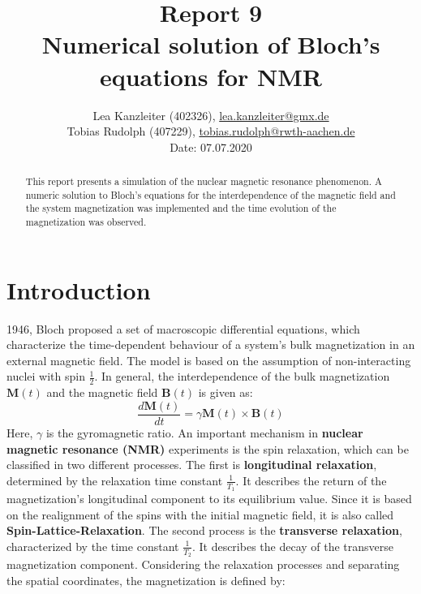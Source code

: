 \documentclass[journal]{IEEEtran} %
\begin{document}
\title{Report 9 \\
Numerical solution of Bloch's equations for NMR}

%
\author{Lea Kanzleiter (402326), \href{mailto:lea.kanzleiter@gmx.de}{lea.kanzleiter@gmx.de}  \\
Tobias Rudolph (407229), \href{mailto:tobias.rudolph@rwth-aachen.de}{tobias.rudolph@rwth-aachen.de} \\
Date: 07.07.2020
}

\maketitle
\begin{abstract}
This report presents a simulation of the nuclear magnetic resonance phenomenon. A numeric solution to Bloch's equations for the interdependence of the magnetic field and the system magnetization was implemented and the time evolution of the magnetization was observed.
\end{abstract}



\section{Introduction}\label{intro}
 1946, Bloch proposed a set of macroscopic differential equations, which characterize the time-dependent behaviour of a system's bulk magnetization in an external magnetic field. The model is based on the assumption of non-interacting nuclei with spin $\frac{1}{2}$. In general, the interdependence of the bulk magnetization $\mathbf{M}(t)$ and the magnetic field $\mathbf{B}(t)$ is given as:
\begin{equation}
    \frac {d \mathbf {M}(t)} {d t} = \gamma  \mathbf {M} (t) \times \mathbf {B} (t)
\end{equation}
Here, $\gamma$ is the gyromagnetic ratio.
An important mechanism in \textbf{nuclear magnetic resonance (NMR)} experiments is the spin relaxation, which can be classified in two different processes. The first is \textbf{longitudinal relaxation}, determined by the relaxation time constant $\frac{1}{T_1}$. It describes the return of the magnetization's longitudinal component to its equilibrium value. Since it is based on the realignment of the spins with the initial magnetic field, it is also called \textbf{Spin-Lattice-Relaxation}.
The second process is the \textbf{transverse relaxation}, characterized by the time constant $\frac{1}{T_2}$.
It describes the decay of the transverse magnetization component. Considering the relaxation processes and separating the spatial coordinates, the magnetization is defined by:
\end{document}
